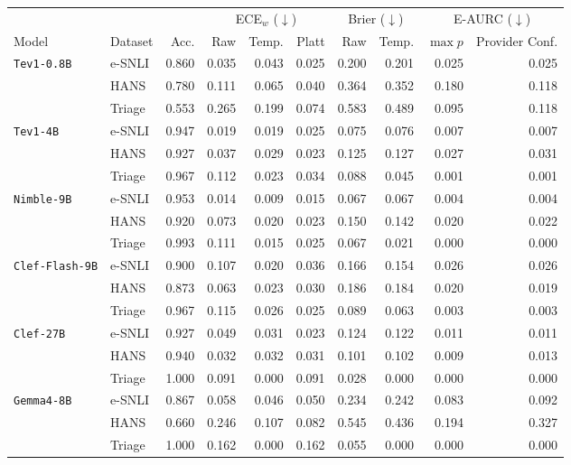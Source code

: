 \begin{tabular}{llrrrrrrrr}
\toprule
 & & & \multicolumn{3}{c}{ECE$_w$ ($\downarrow$)} & \multicolumn{2}{c}{Brier ($\downarrow$)} & \multicolumn{2}{c}{E-AURC ($\downarrow$)} \\
\cmidrule(lr){4-6}\cmidrule(lr){7-8}\cmidrule(lr){9-10}
Model & Dataset & Acc. & Raw & Temp. & Platt & Raw & Temp. & $\max p$ & Provider Conf. \\
\midrule
\texttt{Tev1-0.8B} & e-SNLI & 0.860 & 0.035 & 0.043 & 0.025 & 0.200 & 0.201 & 0.025 & 0.025 \\
 & HANS & 0.780 & 0.111 & 0.065 & 0.040 & 0.364 & 0.352 & 0.180 & 0.118 \\
 & Triage & 0.553 & 0.265 & 0.199 & 0.074 & 0.583 & 0.489 & 0.095 & 0.118 \\
\midrule
\texttt{Tev1-4B} & e-SNLI & 0.947 & 0.019 & 0.019 & 0.025 & 0.075 & 0.076 & 0.007 & 0.007 \\
 & HANS & 0.927 & 0.037 & 0.029 & 0.023 & 0.125 & 0.127 & 0.027 & 0.031 \\
 & Triage & 0.967 & 0.112 & 0.023 & 0.034 & 0.088 & 0.045 & 0.001 & 0.001 \\
\midrule
\texttt{Nimble-9B} & e-SNLI & 0.953 & 0.014 & 0.009 & 0.015 & 0.067 & 0.067 & 0.004 & 0.004 \\
 & HANS & 0.920 & 0.073 & 0.020 & 0.023 & 0.150 & 0.142 & 0.020 & 0.022 \\
 & Triage & 0.993 & 0.111 & 0.015 & 0.025 & 0.067 & 0.021 & 0.000 & 0.000 \\
\midrule
\texttt{Clef-Flash-9B} & e-SNLI & 0.900 & 0.107 & 0.020 & 0.036 & 0.166 & 0.154 & 0.026 & 0.026 \\
 & HANS & 0.873 & 0.063 & 0.023 & 0.030 & 0.186 & 0.184 & 0.020 & 0.019 \\
 & Triage & 0.967 & 0.115 & 0.026 & 0.025 & 0.089 & 0.063 & 0.003 & 0.003 \\
\midrule
\texttt{Clef-27B} & e-SNLI & 0.927 & 0.049 & 0.031 & 0.023 & 0.124 & 0.122 & 0.011 & 0.011 \\
 & HANS & 0.940 & 0.032 & 0.032 & 0.031 & 0.101 & 0.102 & 0.009 & 0.013 \\
 & Triage & 1.000 & 0.091 & 0.000 & 0.091 & 0.028 & 0.000 & 0.000 & 0.000 \\
\midrule
\texttt{Gemma4-8B} & e-SNLI & 0.867 & 0.058 & 0.046 & 0.050 & 0.234 & 0.242 & 0.083 & 0.092 \\
 & HANS & 0.660 & 0.246 & 0.107 & 0.082 & 0.545 & 0.436 & 0.194 & 0.327 \\
 & Triage & 1.000 & 0.162 & 0.000 & 0.162 & 0.055 & 0.000 & 0.000 & 0.000 \\
\bottomrule
\end{tabular}
